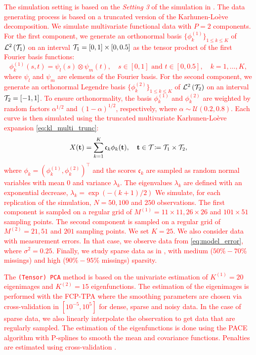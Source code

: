 \textcolor{red}{The simulation setting is based on the \emph{Setting 3} of the simulation in \cite{happMultivariateFunctionalPrincipal2018a}.
The data generating process is based on a truncated version of the Karhunen-Loève decomposition. We simulate multivariate functional data with $P = 2$ components. For the first component, we generate an orthonormal basis $\{\phi^{(1)}_k\}_{1 \leq k \leq K}$ of $\mathcal{L}^{2}\left(\mathcal{T}_{1}\right)$ on an interval $\mathcal{T}_{1} = [0, 1] \times [0, 0.5]$ as the tensor product of the first Fourier basis functions:
\begin{equation}
    \phi^{(1)}_k(s, t) = \psi_l(s) \otimes \psi_m(t), \quad s \in [0, 1] \text{ and } t \in [0, 0.5],\quad k = 1, \dots, K,
\end{equation}
where $\psi_l$ and $\psi_m$ are elements of the Fourier basis. For the second component, we generate an orthonormal Legendre basis $\{\phi^{(2)}_k\}_{1 \leq k \leq K}$ of $\mathcal{L}^{2}\left(\mathcal{T}_{2}\right)$ on an interval $\mathcal{T}_{2} = [-1, 1]$. To ensure orthonormality, the basis $\phi^{(1)}_k$ and $\phi^{(2)}_k$ are weighted by random factors $\alpha^{1/2}$ and $(1 - \alpha)^{1/2}$, respectively, where $\alpha \sim \mathcal{U}(0.2, 0.8)$.
Each curve is then simulated using the truncated multivariate Karhunen-Loève expansion \eqref{eq:kl_multi_trunc}:
\begin{equation}
    X(\mathbf{t}) = \sum_{k = 1}^K \mathfrak{c}_k \phi_k(\mathbf{t}), \quad \mathbf{t} \in \mathcal{T}_{} \coloneqq \mathcal{T}_{1} \times \mathcal{T}_{2},
\end{equation}
where $\phi_k = (\phi^{(1)}_k, \phi^{(2)}_k)^\top$ and the scores $\mathfrak{c}_k$ are sampled as random normal variables with mean $0$ and variance $\lambda_k$. The eigenvalues $\lambda_k$ are defined with an exponential decrease, $\lambda_k = \exp(-(k + 1)/2)$ We simulate, for each replication of the simulation, $N = 50, 100$ and $250$ observations. The first component is sampled on a regular grid of $M^{(1)} = 11 \times 11, 26 \times 26$ and $101 \times 51$ sampling points. The second component is sampled on a regular grid of $M^{(2)} = 21, 51$ and $201$ sampling points. We set $K = 25$.}
\textcolor{red}{We also consider data with measurement errors. In that case, we observe data from \eqref{eq:model_error}, where $\sigma^2 = 0.25$. Finally, we study sparse data as in \cite{happMultivariateFunctionalPrincipal2018a}, with medium ($50\%-70\%$ missings) and high ($90\%-95\%$ missings) sparsity.}

\textcolor{red}{The \texttt{(Tensor) PCA} method is based on the univariate estimation of $K^{(1)} = 20$ eigenimages and $K^{(2)} = 15$ eigenfunctions. The estimation of the eigenimages is performed with the FCP-TPA where the smoothing parameters are chosen via cross-validation in $[10^{-5}, 10^5]$ for dense, sparse and noisy data. In the case of sparse data, we also linearly interpolate the observation to get data that are regularly sampled. The estimation of the eigenfunctions is done using the PACE algorithm \citep{yaoFunctionalDataAnalysis2005} with P-splines to smooth the mean and covariance functions. Penalties are estimated using cross-validation \citep{eilersFlexibleSmoothingBsplines1996}.}

